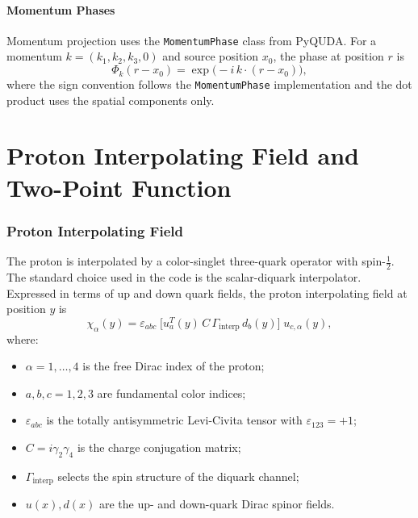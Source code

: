 \documentclass[11pt,a4paper]{article}
\newcommand{\eps}{\varepsilon}
\newcommand{\Gint}{\Gamma_{\text{interp}}}
\newcommand{\Cmat}{C}
\newcommand{\xsrc}{x_{0}}
\begin{document}
\subsection{Momentum Phases}

Momentum projection uses the \texttt{MomentumPhase} class from PyQUDA.  For a
momentum $k = (k_{1},k_{2},k_{3},0)$ and source position $\xsrc$, the phase at
position $r$ is
\begin{equation}
  \Phi_{k}(r-\xsrc) = \exp\!\big(-i\,k\cdot(r-\xsrc)\big),
\end{equation}
where the sign convention follows the \texttt{MomentumPhase} implementation and
the dot product uses the spatial components only.

\part{Proton Interpolating Field and Two-Point Function}

\section{Proton Interpolating Field}

The proton is interpolated by a color-singlet three-quark operator with
spin-$\tfrac{1}{2}$.  The standard choice used in the code is the scalar-diquark
interpolator.  Expressed in terms of up and down quark fields, the proton
interpolating field at position $y$ is
\begin{equation}
  \boxed{
  \chi_{\alpha}(y) = \eps_{abc}\;
  \big[u_{a}^{T}(y)\,\Cmat\,\Gint\,d_{b}(y)\big]\;
  u_{c,\alpha}(y)
  },
  \label{eq:chi}
\end{equation}
where:
\begin{itemize}
  \item $\alpha = 1,\dots,4$ is the free Dirac index of the proton;
  \item $a,b,c = 1,2,3$ are fundamental color indices;
  \item $\eps_{abc}$ is the totally antisymmetric Levi-Civita tensor with
        $\eps_{123} = +1$;
  \item $\Cmat = i\gamma_{2}\gamma_{4}$ is the charge conjugation matrix;
  \item $\Gint$ selects the spin structure of the diquark channel;
  \item $u(x), d(x)$ are the up- and down-quark Dirac spinor fields.
\end{itemize}
\end{document}
